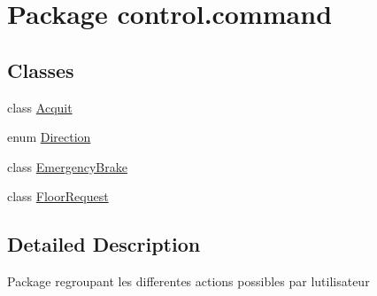 \hypertarget{namespacecontrol_1_1command}{}\section{Package control.\+command}
\label{namespacecontrol_1_1command}
\subsection*{Classes}
\begin{DoxyCompactItemize}
\item 
class \mbox{\hyperlink{classcontrol_1_1command_1_1_acquit}{Acquit}}
\item 
enum \mbox{\hyperlink{enumcontrol_1_1command_1_1_direction}{Direction}}
\item 
class \mbox{\hyperlink{classcontrol_1_1command_1_1_emergency_brake}{Emergency\+Brake}}
\item 
class \mbox{\hyperlink{classcontrol_1_1command_1_1_floor_request}{Floor\+Request}}
\end{DoxyCompactItemize}


\subsection{Detailed Description}
Package regroupant les differentes actions possibles par l\textquotesingle{}utilisateur 
